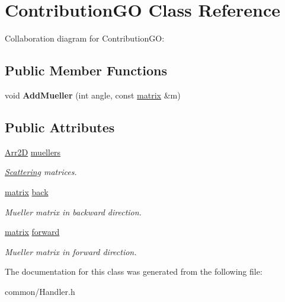 \hypertarget{class_contribution_g_o}{}\section{Contribution\+GO Class Reference}
\label{class_contribution_g_o}


Collaboration diagram for Contribution\+GO\+:
\subsection*{Public Member Functions}
\begin{DoxyCompactItemize}
\item 
\mbox{\label{class_contribution_g_o_aed705673c76a0b5db8f465056e0f3de5}} 
void {\bfseries Add\+Mueller} (int angle, const \mbox{\hyperlink{classmatrix}{matrix}} \&m)
\end{DoxyCompactItemize}
\subsection*{Public Attributes}
\begin{DoxyCompactItemize}
\item 
\mbox{\label{class_contribution_g_o_a5d24a87ebb01226a4796c4372a87bda7}} 
\mbox{\hyperlink{class_arr2_d}{Arr2D}} \mbox{\hyperlink{class_contribution_g_o_a5d24a87ebb01226a4796c4372a87bda7}{muellers}}
\begin{DoxyCompactList}\small\item\em \mbox{\hyperlink{class_scattering}{Scattering}} matrices. \end{DoxyCompactList}\item 
\mbox{\label{class_contribution_g_o_ac0f142d78242514788c7b811cd91675e}} 
\mbox{\hyperlink{classmatrix}{matrix}} \mbox{\hyperlink{class_contribution_g_o_ac0f142d78242514788c7b811cd91675e}{back}}
\begin{DoxyCompactList}\small\item\em Mueller matrix in backward direction. \end{DoxyCompactList}\item 
\mbox{\label{class_contribution_g_o_a9beff7b30c3e6f3cb7ea6e0bf1c4957b}} 
\mbox{\hyperlink{classmatrix}{matrix}} \mbox{\hyperlink{class_contribution_g_o_a9beff7b30c3e6f3cb7ea6e0bf1c4957b}{forward}}
\begin{DoxyCompactList}\small\item\em Mueller matrix in forward direction. \end{DoxyCompactList}\end{DoxyCompactItemize}


The documentation for this class was generated from the following file\+:\begin{DoxyCompactItemize}
\item 
common/Handler.\+h\end{DoxyCompactItemize}
